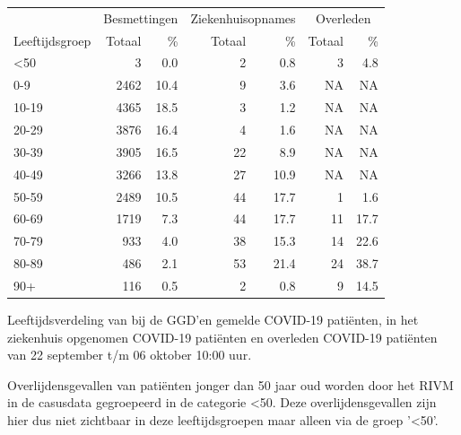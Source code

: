 \documentclass[
  english,
  man,floatsintext]{apa6}
\begin{document}
\begin{table}
\centering\begingroup\fontsize{11}{13}\selectfont

\begin{threeparttable}
\begin{tabular}{lrrrrrr}
\toprule
\multicolumn{1}{c}{ } & \multicolumn{2}{c}{Besmettingen} & \multicolumn{2}{c}{Ziekenhuisopnames} & \multicolumn{2}{c}{Overleden} \\
\cmidrule(l{3pt}r{3pt}){2-3} \cmidrule(l{3pt}r{3pt}){4-5} \cmidrule(l{3pt}r{3pt}){6-7}
Leeftijdsgroep & Totaal & \% & Totaal & \% & Totaal & \%\\
\midrule
<50 & 3 & 0.0 & 2 & 0.8 & 3 & 4.8\\
0-9 & 2462 & 10.4 & 9 & 3.6 & NA & NA\\
10-19 & 4365 & 18.5 & 3 & 1.2 & NA & NA\\
20-29 & 3876 & 16.4 & 4 & 1.6 & NA & NA\\
30-39 & 3905 & 16.5 & 22 & 8.9 & NA & NA\\
40-49 & 3266 & 13.8 & 27 & 10.9 & NA & NA\\
50-59 & 2489 & 10.5 & 44 & 17.7 & 1 & 1.6\\
60-69 & 1719 & 7.3 & 44 & 17.7 & 11 & 17.7\\
70-79 & 933 & 4.0 & 38 & 15.3 & 14 & 22.6\\
80-89 & 486 & 2.1 & 53 & 21.4 & 24 & 38.7\\
90+ & 116 & 0.5 & 2 & 0.8 & 9 & 14.5\\
\bottomrule
\end{tabular}
\begin{tablenotes}
\item[1] Leeftijdsverdeling van bij de GGD’en gemelde COVID-19 patiënten, in het ziekenhuis opgenomen COVID-19 patiënten en overleden COVID-19 patiënten van 22 september t/m 06 oktober 10:00 uur.
\item[2] Overlijdensgevallen van patiënten jonger dan 50 jaar oud worden door het RIVM in de casusdata gegroepeerd in de categorie <50. Deze overlijdensgevallen zijn hier dus niet zichtbaar in deze leeftijdsgroepen maar alleen via de groep '<50'.
\end{tablenotes}
\end{threeparttable}
\endgroup{}
\end{table}

\newpage
\end{document}
